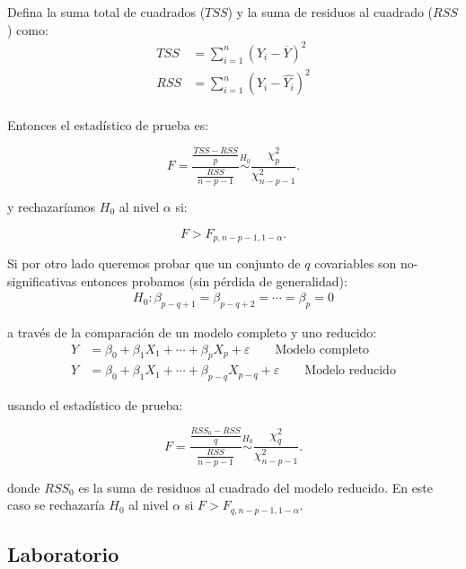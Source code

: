 \documentclass[
  12pt,
]{book}
\begin{document}
Defina la suma total de cuadrados (\(TSS\)) y la suma de residuos al
cuadrado (\(RSS\)) como: \begin{align*}
 TSS &= \sum_{i=1}^{n} \left( Y_{i} -\overline{Y} \right)^{2} \\
 RSS &= \sum_{i=1}^{n} \left( Y_{i} -\hat{Y_i} \right)^{2} \\
 \end{align*}

Entonces el estadístico de prueba es:

\begin{equation*}
 F = \frac{\frac{TSS-RSS}{p}}{\frac{RSS}{n-p-1}} \stackrel{H_0}{\sim} \frac{\chi^{2}_{p}}{\chi^{2}_{n-p-1}}.
 \end{equation*}

y rechazaríamos \(H_{0}\) al nivel \(\alpha\) si:

\begin{equation*}
 F > F_{p, n-p-1, 1-\alpha}.
 \end{equation*}

Si por otro lado queremos probar que un conjunto de \(q\) covariables
son no-significativas entonces probamos (sin pérdida de generalidad):
\begin{align*}
H_0: \beta_{p-q+1}=\beta_{p-q+2}=\cdots=\beta_p=0
\end{align*}

a través de la comparación de un modelo completo y uno reducido:
\begin{align*}
Y&=\beta_{0}+ \beta_{1}X_{1} + \cdots + \beta_{p}X_{p} + \varepsilon \qquad \text{Modelo completo} \\
Y&=\beta_{0}+ \beta_{1}X_{1} + \cdots + \beta_{p-q}X_{p-q} + \varepsilon \qquad \text{Modelo reducido}
\end{align*}

usando el estadístico de prueba:

\begin{equation*}
 F = \frac{\frac{RSS_0-RSS}{q}}{\frac{RSS}{n-p-1}} \stackrel{H_0}{\sim} \frac{\chi^{2}_{q}}{\chi^{2}_{n-p-1}}.
 \end{equation*}

donde \(RSS_0\) es la suma de residuos al cuadrado del modelo reducido.
En este caso se rechazaría \(H_0\) al nivel \(\alpha\) si
\(F>F_{q, n-p-1, 1-\alpha}\).

\hypertarget{laboratorio-2}{%
\subsection{Laboratorio}\label{laboratorio-2}}
\end{document}
